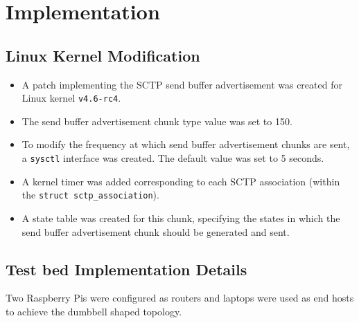 \chapter{Implementation}

\section{Linux Kernel Modification}
\begin{itemize}
  \item A patch implementing the SCTP send buffer advertisement was created for
    Linux kernel \texttt{v4.6-rc4}.
  \item The send buffer advertisement chunk type value was set to 150.
  \item To modify the frequency at which send buffer advertisement chunks are
    sent, a \texttt{sysctl} interface was created. The default value was set to
    5 seconds.
  \item A kernel timer was added corresponding to each SCTP association
    (within the \texttt{struct sctp\_association}).
  \item A state table was created for this chunk, specifying the states in which
    the send buffer advertisement chunk should be generated and sent.
\end{itemize}

\section{Test bed Implementation Details}
Two Raspberry Pis were configured as routers and laptops were used as end hosts
to achieve the dumbbell shaped topology.

